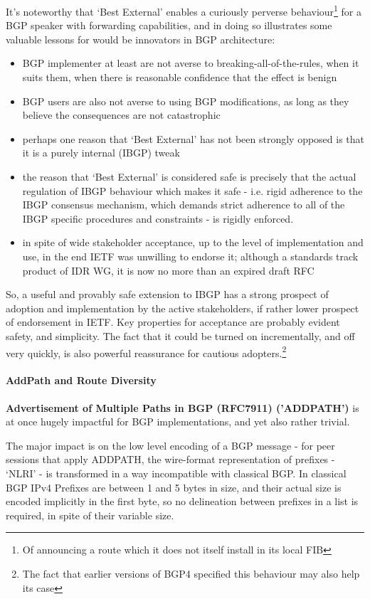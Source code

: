 It's noteworthy that `Best External' enables a curiously perverse behaviour\footnote{Of announcing a route which it does not itself install in its local FIB} for a BGP speaker with forwarding capabilities, and in doing so illustrates some valuable lessons for would be innovators in BGP architecture:
\begin{itemize}
	\item BGP implementer at least are not averse to breaking-all-of-the-rules, when it suits them, when there is  reasonable confidence that the effect is benign
	\item BGP users are also not averse to using BGP modifications, as long as they believe the consequences are not catastrophic
	\item perhaps one reason that `Best External' has not been strongly opposed is that it is a purely internal (IBGP) tweak
	\item the reason that `Best External' is considered safe is precisely that the actual regulation of IBGP behaviour which makes it safe - i.e. rigid adherence to the IBGP consensus mechanism, which demands strict adherence to all of the IBGP specific procedures and constraints - is rigidly enforced.
	\item in spite of wide stakeholder acceptance, up to the level of implementation and use, in the end IETF was unwilling to endorse it; although a standards track product of IDR WG, it is now no more than an expired draft RFC
\end{itemize}
So, a useful and provably safe extension to IBGP has a strong prospect of adoption and implementation by the active stakeholders, if rather lower prospect of endorsement in IETF.  Key properties for acceptance are probably evident safety, and simplicity.  The fact that it could be turned on incrementally, and off very quickly, is also powerful reassurance for cautious adopters.\footnote{The fact that earlier versions of BGP4\cite{rfc1771} specified this behaviour may also help its case}

\paragraph{AddPath and Route Diversity}

\textbf{Advertisement of Multiple Paths in BGP (RFC7911) ('ADDPATH')} \cite{rfc7911} is at once hugely impactful for BGP implementations, and yet also rather trivial.

The major impact is on the low level encoding of a BGP message - for peer sessions that apply ADDPATH, the wire-format representation of prefixes - `NLRI' -  is transformed in a way incompatible with classical BGP.  In classical BGP IPv4 Prefixes are between 1 and 5 bytes in size, and their actual size is encoded implicitly in the first byte, so no delineation between prefixes in a list is required, in spite of their variable size.


